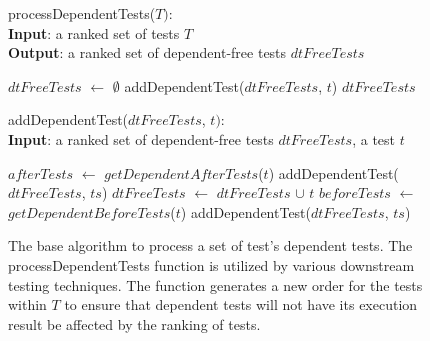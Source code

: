 \begin{figure}[t]
	processDependentTests($\mathit{T}):$\\
	\textbf{Input}: a ranked set of tests $\mathit{T}$\\
	\textbf{Output}: a ranked set of dependent-free tests $\mathit{dtFreeTests}$\\
	\vspace{-5mm}
	\begin{algorithmic}[1]
		\STATE $\mathit{dtFreeTests}$ $\leftarrow$ $\emptyset$
			\STATE addDependentTest($\mathit{dtFreeTests}$, $\mathit{t}$)	
		\ENDFOR
		\RETURN $\mathit{dtFreeTests}$
	\end{algorithmic}

	addDependentTest($\mathit{dtFreeTests}$, $\mathit{t}):$\\
	\textbf{Input}: a ranked set of dependent-free tests $\mathit{dtFreeTests}$, a test $\mathit{t}$\\
	\vspace{-5mm}
	\begin{algorithmic}[1]
			\STATE $\mathit{afterTests}$ $\leftarrow$ $\mathit{getDependentAfterTests}$($\mathit{t}$)
				\STATE addDependentTest($\mathit{dtFreeTests}$, $\mathit{ts}$)
			\ENDFOR
			\STATE $\mathit{dtFreeTests}$ $\leftarrow$ $\mathit{dtFreeTests}$ $\cup$ $\mathit{t}$
			\STATE $\mathit{beforeTests}$ $\leftarrow$ $\mathit{getDependentBeforeTests}$($\mathit{t}$)
				\STATE addDependentTest($\mathit{dtFreeTests}$, $\mathit{ts}$)
			\ENDFOR
		\ENDIF
	\end{algorithmic}
	\vspace{-3mm}
	\caption {
		The base algorithm to process a set of test's dependent tests. The processDependentTests function is utilized by various downstream testing techniques. The function generates a new order for the tests within $\mathit{T}$ to ensure that dependent tests will not have its execution result be affected by the ranking of tests. 
	}
	\label{fig:detectingDT}
\end{figure}


